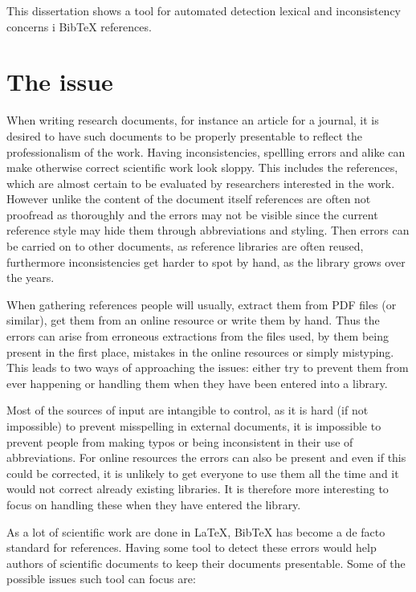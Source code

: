 
This dissertation shows a tool for automated detection lexical
and inconsistency concerns i Bib{\TeX} references.


\section{The issue}

When writing research documents, for instance an article for a
journal, it is desired to have such documents to be properly
presentable to reflect the professionalism of the work.  Having
inconsistencies, spellling errors and alike can make otherwise correct
scientific work look sloppy.  This includes the references, which are
almost certain to be evaluated by researchers interested in the work.
However unlike the content of the document itself references are often
not proofread as thoroughly and the errors may not be visible since
the current reference style may hide them through abbreviations and
styling.  Then errors can be carried on to other documents, as
reference libraries are often reused, furthermore inconsistencies get
harder to spot by hand, as the library grows over the years.

When gathering references people will usually, extract them from PDF
files (or similar), get them from an online resource or write them by
hand.  Thus the errors can arise from erroneous extractions from the
files used, by them being present in the first place, mistakes in the
online resources or simply mistyping.  This leads to two ways of
approaching the issues: either try to prevent them from ever happening
or handling them when they have been entered into a library.

Most of the sources of input are intangible to control, as it is hard
(if not impossible) to prevent misspelling in external documents, it
is impossible to prevent people from making typos or being
inconsistent in their use of abbreviations.  For online resources the
errors can also be present and even if this could be corrected, it is
unlikely to get everyone to use them all the time and it would not
correct already existing libraries.  It is therefore more
interesting to focus on handling these when they have entered the
library.

As a lot of  scientific work are
done in {\LaTeX}, Bib{\TeX} has become a de facto standard for
references.  Having some tool to detect these errors would help
authors of scientific documents to keep their documents presentable.
Some of the possible issues such tool can focus are:

